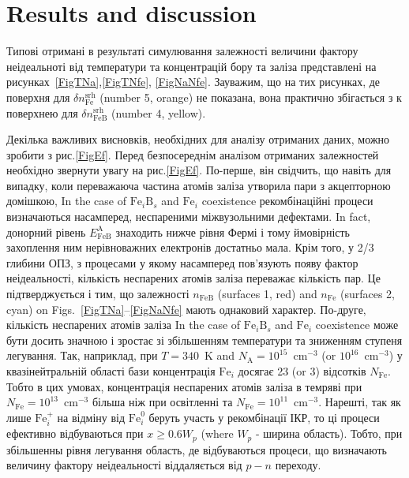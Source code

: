 \documentclass[12pt]{article}
\begin{document}


\section{Results and discussion}

Типові отримані в результаті симулювання залежності величини фактору неідеальноті від температури та концентрацій бору та заліза представлені на рисунках~\ref{FigTNa},\ref{FigTNfe}, \ref{FigNaNfe}.
Зауважим, що на тих рисунках, де поверхня для $\delta n_\mathrm{Fe}^\mathrm{srh}$ (number 5, orange) не показана, вона практично збігається з к поверхнею для $\delta n_\mathrm{FeB}^\mathrm{srh}$ (number 4, yellow).

Декілька важливих висновків, необхідних для аналізу отриманих даних, можно зробити з рис.\ref{FigEf}.
Перед безпосереднім аналізом отриманих залежностей необхідно звернути увагу на рис.\ref{FigEf}.
По-перше, він свідчить, що навіть для випадку, коли переважаюча частина
атомів заліза утворила пари з  акцепторною домішкою,
In the case of $\mathrm{Fe}_i\mathrm{B}_s$ and $\mathrm{Fe}_i$ coexistence
рекомбінаційні процеси визначаються насамперед, неспареними міжвузольними дефектами.
In fact, донорний рівень $E_{\mathrm{FeB}}^\mathrm{A}$ знаходить нижче рівня Фермі і тому ймовірність захоплення ним нерівноважних електронів достатньо мала.
Крім того, у 2/3 глибини ОПЗ, з процесами у якому насамперед пов'язують появу фактор неідеальності,
кількість неспарених атомів заліза переважає кількість пар.
Це підтверджується і тим, що залежності $n_\mathrm{FeB}$ (surfaces 1, red) and $n_\mathrm{Fe}$ (surfaces 2, cyan) on Figs.~\ref{FigTNa}--\ref{FigNaNfe} мають однаковий характер.
По-друге, кількість неспарених атомів заліза In the case of $\mathrm{Fe}_i\mathrm{B}_s$ and $\mathrm{Fe}_i$ coexistence може бути досить значною і зростає зі збільшенням температури та
зниженням ступеня легування.
Так, наприклад, при $T=340$~K and $N_\mathrm{A}=10^{15}$~cm$^{-3}$ (or $10^{16}$~cm$^{-3}$) у квазінейтральній області бази
концентрація $\mathrm{Fe}_i$  досягає 23 (or 3) відсотків $N_\mathrm{Fe}$.
Тобто в цих умовах, концентрація неспарених атомів заліза в темряві при $N_\mathrm{Fe}=10^{13}$~cm$^{-3}$ більша
ніж при освітленні та $N_\mathrm{Fe}=10^{11}$~cm$^{-3}$.
Нарешті, так як лише $\mathrm{Fe}_i^+$ на відміну від $\mathrm{Fe}_i^0$ беруть участь у рекомбінації ІКР,
то ці процеси ефективно відбуваються при $x\geq0.6W_p$ (where $W_p$ - ширина область).
Тобто, при збільшенны рівня легування область, де відбуваються процеси, що визначають величину фактору неідеальності віддаляється від $p-n$ переходу.
\end{document}
